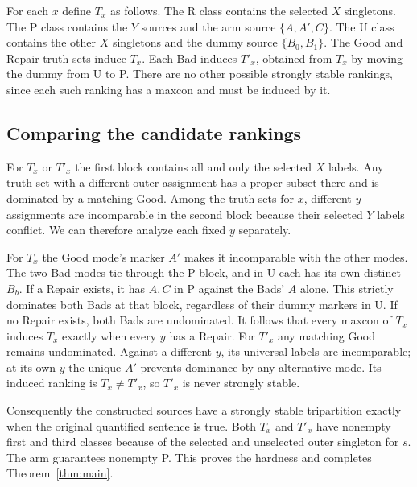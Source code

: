 \documentclass[11pt,a4paper]{amsart}
\begin{document}
For each $x$ define $T_x$ as follows. The R class contains the selected $X$ singletons. The P class contains the $Y$ sources and the arm source $\{A,A',C\}$. The U class contains the other $X$ singletons and the dummy source $\{B_0,B_1\}$. The Good and Repair truth sets induce $T_x$. Each Bad induces $T'_x$, obtained from $T_x$ by moving the dummy from U to P. There are no other possible strongly stable rankings, since each such ranking has a maxcon and must be induced by it.

\subsection{Comparing the candidate rankings}
For $T_x$ or $T'_x$ the first block contains all and only the selected $X$ labels. Any truth set with a different outer assignment has a proper subset there and is dominated by a matching Good. Among the truth sets for $x$, different $y$ assignments are incomparable in the second block because their selected $Y$ labels conflict. We can therefore analyze each fixed $y$ separately.

For $T_x$ the Good mode's marker $A'$ makes it incomparable with the other modes. The two Bad modes tie through the P block, and in U each has its own distinct $B_b$. If a Repair exists, it has $A,C$ in P against the Bads' $A$ alone. This strictly dominates both Bads at that block, regardless of their dummy markers in U. If no Repair exists, both Bads are undominated. It follows that every maxcon of $T_x$ induces $T_x$ exactly when every $y$ has a Repair. For $T'_x$ any matching Good remains undominated. Against a different $y$, its universal labels are incomparable; at its own $y$ the unique $A'$ prevents dominance by any alternative mode. Its induced ranking is $T_x\ne T'_x$, so $T'_x$ is never strongly stable.

Consequently the constructed sources have a strongly stable tripartition exactly when the original quantified sentence is true. Both $T_x$ and $T'_x$ have nonempty first and third classes because of the selected and unselected outer singleton for $s$. The arm guarantees nonempty P. This proves the hardness and completes Theorem~\ref{thm:main}.

\newpage
\end{document}

